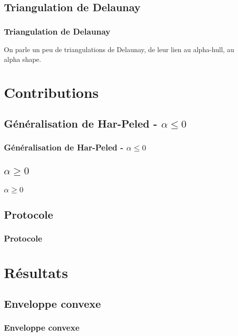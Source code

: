 \documentclass{beamer}
\begin{document}
\subsection{Triangulation de Delaunay}  %
\begin{frame}
\frametitle{Triangulation de Delaunay}
On parle un peu de triangulations de Delaunay, de leur lien au alpha-hull, au alpha shape.
\end{frame}

\section{Contributions}

\subsection{Généralisation de Har-Peled - $\alpha \leq 0$}
\begin{frame}
\frametitle{Généralisation de Har-Peled - $\alpha \leq 0$}

\end{frame}

\subsection{$\alpha \geq 0$}
\begin{frame}
\frametitle{$\alpha \geq 0$}
\end{frame}

\subsection{Protocole}
\begin{frame}
\frametitle{Protocole}
\end{frame}

\section{Résultats}

\subsection{Enveloppe convexe}
\begin{frame}
\frametitle{Enveloppe convexe}
\end{frame}
\end{document}
